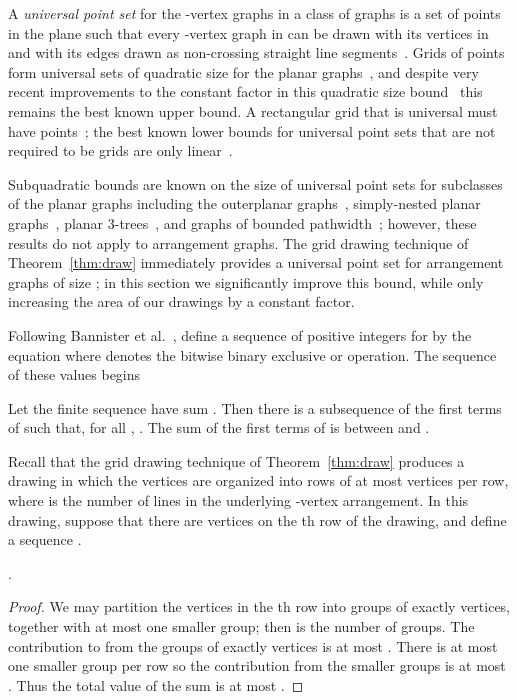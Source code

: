 \documentclass[oribibl]{llncs}
\begin{document}
A \emph{universal point set} for the -vertex graphs in a class  of graphs is a set  of points in the plane such that every -vertex graph in  can be drawn with its vertices in  and with its edges drawn as non-crossing straight line segments~\cite{ChrKar-SN-89}.
Grids of  points form universal sets of quadratic size for the planar graphs~\cite{FraPacPol-STOC-88,Sch-SODA-90}, and despite very recent improvements to the constant factor in this quadratic size bound~\cite{BanCheDev-13} this remains the best known upper bound. A rectangular grid that is universal must have  points~\cite{DolLeiTri-ACR-84,Val-TC-81}; the best known lower bounds for universal point sets that are not required to be grids are only linear~\cite{ChrKar-SN-89}.

Subquadratic bounds are known on the size of universal point sets for subclasses of the planar graphs including the outerplanar graphs~\cite{GriMohPol-AMM-1991}, simply-nested planar graphs~\cite{AngDibKau-GD-2012,BanCheDev-13}, planar 3-trees~\cite{FulTot-WADS-2013}, and graphs of bounded pathwidth~\cite{BanCheDev-13}; however, these results do not apply to arrangement graphs. The grid drawing technique of Theorem~\ref{thm:draw} immediately provides a universal point set for arrangement graphs of size ; in this section we significantly improve this bound, while only increasing the area of our drawings by a constant factor.

Following Bannister et al.~\cite{BanCheDev-13}, define a sequence of positive integers  for  by the equation  where  denotes the bitwise binary exclusive or operation. The sequence of these values begins


\begin{lemma}
\label{lem:sawtooth}
Let the finite sequence  have sum . Then there is a subsequence  of the first  terms of  such that, for all , . The sum of the first  terms of  is between  and .
\end{lemma}

Recall that the grid drawing technique of Theorem~\ref{thm:draw} produces a drawing in which the vertices are organized into  rows of at most  vertices per row, where  is the number of lines in the underlying -vertex arrangement. In this drawing, suppose that there are  vertices on the th row of the drawing, and define a sequence .

\begin{lemma}
.
\end{lemma}

\begin{proof}
We may partition the  vertices in the th row  into  groups of exactly  vertices, together with at most one smaller group; then  is the number of groups. The contribution to  from the groups of exactly  vertices is at most . There is at most one smaller group per row so the contribution from the smaller groups is at most . Thus the total value of the sum is at most .
\end{proof}
\end{document}
